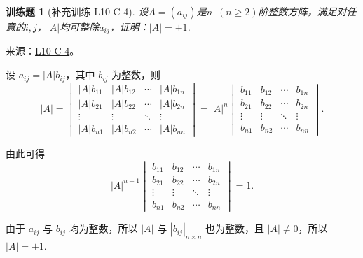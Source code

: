\documentclass[UTF8,12pt,a4paper,fontset=fandol]{ctexart}
\newtheorem{exercise}{训练题}[section]
\begin{document}
\begin{exercise}[补充训练 L10-C-4]\label{prob:L10-C-4}
设$A=(a_{ij})$是$n\enspace(n\geqslant 2)$阶整数方阵，满足对任意的$i,j$，$|A|$均可整除$a_{ij}$，证明：$|A|=\pm 1$.
\end{exercise}
\noindent 来源：\href{https://github.com/yhwu-is/Linear-Algebra-Left-Undone/blob/new/%E8%AE%B2%E4%B9%89/%E4%B8%93%E9%A2%98/10%20%E8%A1%8C%E5%88%97%E5%BC%8F.tex}{L10-C-4}。
\begin{solve}
设 $a_{ij} = |A| b_{ij}$，其中 $b_{ij}$ 为整数，则
            \[
                |A| = \begin{vmatrix}
                    |A| b_{11} & |A| b_{12} & \cdots & |A| b_{1n} \\
                    |A| b_{21} & |A| b_{22} & \cdots & |A| b_{2n} \\
                    \vdots     & \vdots     & \ddots & \vdots     \\
                    |A| b_{n1} & |A| b_{n2} & \cdots & |A| b_{nn}
                \end{vmatrix}
                = |A|^n \begin{vmatrix}
                    b_{11} & b_{12} & \cdots & b_{1n} \\
                    b_{21} & b_{22} & \cdots & b_{2n} \\
                    \vdots & \vdots & \ddots & \vdots \\
                    b_{n1} & b_{n2} & \cdots & b_{nn}
                \end{vmatrix}.
            \]

            由此可得
            \[
                |A|^{n-1} \begin{vmatrix}
                    b_{11} & b_{12} & \cdots & b_{1n} \\
                    b_{21} & b_{22} & \cdots & b_{2n} \\
                    \vdots & \vdots & \ddots & \vdots \\
                    b_{n1} & b_{n2} & \cdots & b_{nn}
                \end{vmatrix} = 1.
            \]

            由于 $a_{ij}$ 与 $b_{ij}$ 均为整数，所以 $|A|$ 与 $|b_{ij}|_{n \times n}$ 也为整数，且 $|A| \neq 0$，所以 $|A| = \pm 1$.
\end{solve}
\end{document}
